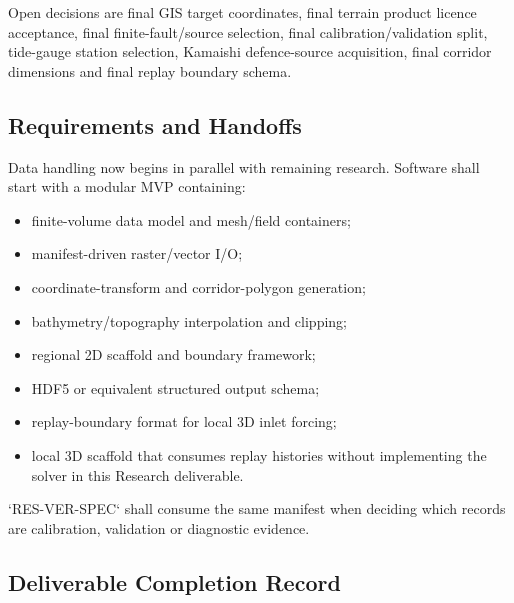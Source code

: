 Open decisions are final GIS target coordinates, final terrain product
licence acceptance, final finite-fault/source selection, final
calibration/validation split, tide-gauge station selection, Kamaishi
defence-source acquisition, final corridor dimensions and final replay
boundary schema.

\subsection{Requirements and Handoffs}
\label{sec:res-dat-cas-requirements}

Data handling now begins in parallel with remaining research. Software
shall start with a modular MVP containing:

\begin{itemize}
  \item finite-volume data model and mesh/field containers;
  \item manifest-driven raster/vector I/O;
  \item coordinate-transform and corridor-polygon generation;
  \item bathymetry/topography interpolation and clipping;
  \item regional 2D scaffold and boundary framework;
  \item HDF5 or equivalent structured output schema;
  \item replay-boundary format for local 3D inlet forcing;
  \item local 3D scaffold that consumes replay histories without
    implementing the solver in this Research deliverable.
\end{itemize}

`RES-VER-SPEC` shall consume the same manifest when deciding which
records are calibration, validation or diagnostic evidence.

\subsection{Deliverable Completion Record}
\label{sec:res-dat-cas-completion-record}

%
%
%
